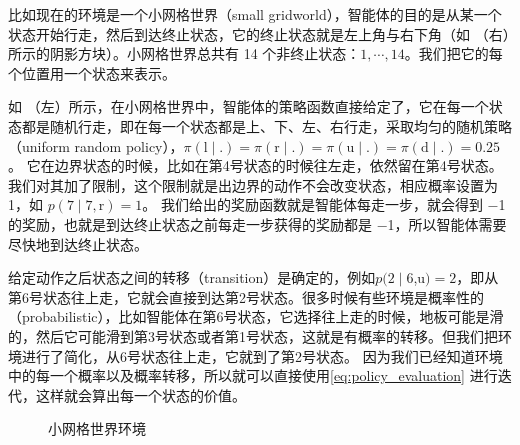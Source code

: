 比如现在的环境是一个小网格世界（small gridworld），智能体的目的是从某一个状态开始行走，然后到达终止状态，它的终止状态就是左上角与右下角（如 （右）所示的阴影方块）。小网格世界总共有 14 个非终止状态：$1,\cdots,14$。我们把它的每个位置用一个状态来表示。

如 （左）所示，在小网格世界中，智能体的策略函数直接给定了，它在每一个状态都是随机行走，即在每一个状态都是上、下、左、右行走，采取均匀的随机策略（uniform random policy），$\pi(\mathrm{l} \mid .)=\pi(\mathrm{r} \mid .)=\pi(\mathrm{u} \mid .)=\pi(\mathrm{d} \mid .)=0.25$。 
它在边界状态的时候，比如在第4号状态的时候往左走，依然留在第4号状态。我们对其加了限制，这个限制就是出边界的动作不会改变状态，相应概率设置为1，如 $p(7\mid7,\mathrm{r})=1$。 
我们给出的奖励函数就是智能体每走一步，就会得到 $-$1 的奖励，也就是到达终止状态之前每走一步获得的奖励都是 $-$1，所以智能体需要尽快地到达终止状态。

给定动作之后状态之间的转移（transition）是确定的，例如$p(2 \mid 6$,u$)=2$，即从第6号状态往上走，它就会直接到达第2号状态。很多时候有些环境是概率性的（probabilistic），比如智能体在第6号状态，它选择往上走的时候，地板可能是滑的，然后它可能滑到第3号状态或者第1号状态，这就是有概率的转移。但我们把环境进行了简化，从6号状态往上走，它就到了第2号状态。
因为我们已经知道环境中的每一个概率以及概率转移，所以就可以直接使用\eqref{eq:policy_evaluation} 进行迭代，这样就会算出每一个状态的价值。

\begin{figure}[hbt]
  \centering
  \caption{小网格世界环境}
  \label{fig:fig2.35}
\end{figure}

